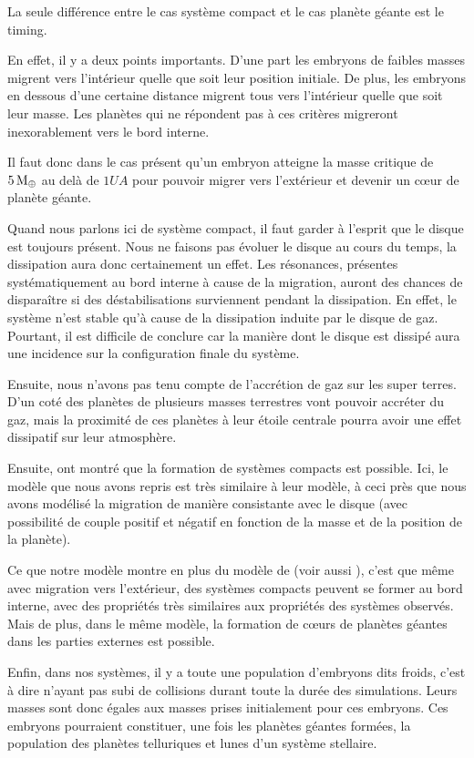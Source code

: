 La seule différence entre le cas système compact et le cas planète géante est le timing. 

En effet, il y a deux points importants. D'une part les embryons de faibles masses migrent vers l'intérieur quelle que soit leur position initiale. De plus, les embryons en dessous d'une certaine distance migrent tous vers l'intérieur quelle que soit leur masse. Les planètes qui ne répondent pas à ces critères migreront inexorablement vers le bord interne. 

Il faut donc dans le cas présent qu'un embryon atteigne la masse critique de $5\mathrm{\thinspace M_\oplus}$ au delà de $1\unit{UA}$ pour pouvoir migrer vers l'extérieur et devenir un cœur de planète géante.

\bigskip

Quand nous parlons ici de système compact, il faut garder à l'esprit que le disque est toujours présent. Nous ne faisons pas évoluer le disque au cours du temps, la dissipation aura donc certainement un effet. Les résonances, présentes systématiquement au bord interne à cause de la migration, auront des chances de disparaître si des déstabilisations surviennent pendant la dissipation. En effet, le système n'est stable qu'à cause de la dissipation induite par le disque de gaz. Pourtant, il est difficile de conclure car la manière dont le disque est dissipé aura une incidence sur la configuration finale du système. 

Ensuite, nous n'avons pas tenu compte de l'accrétion de gaz sur les super terres. D'un coté des planètes de plusieurs masses terrestres vont pouvoir accréter du gaz, mais la proximité de ces planètes à leur étoile centrale pourra avoir une effet dissipatif sur leur atmosphère. 

Ensuite, \cite{terquem2007migration} ont montré que la formation de systèmes compacts est possible. Ici, le modèle que nous avons repris est très similaire à leur modèle, à ceci près que nous avons modélisé la migration de manière consistante avec le disque (avec possibilité de couple positif et négatif en fonction de la masse et de la position de la planète). 

Ce que notre modèle montre en plus du modèle de \cite{terquem2007migration} (voir aussi \cite{ogihara2007accretion,
cresswell2008three}), c'est que même avec migration vers l'extérieur, des systèmes compacts peuvent se former au bord interne,
avec des propriétés très similaires aux propriétés des systèmes observés. Mais de plus, dans le même modèle, la formation de
cœurs de planètes géantes dans les parties externes est possible. 

\bigskip

Enfin, dans nos systèmes, il y a toute une population d'embryons dits froids, c'est à dire n'ayant pas subi de collisions durant toute la durée des simulations. Leurs masses sont donc égales aux masses prises initialement pour ces embryons. Ces embryons pourraient constituer, une fois les planètes géantes formées, la population des planètes telluriques et lunes d'un système stellaire. 